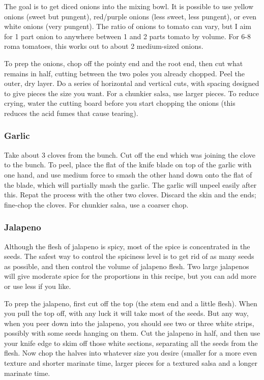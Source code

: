 The goal is to get diced onions into the mixing bowl. It is possible to use yellow onions (sweet but pungent), red/purple onions (less sweet, less pungent), or even white onions (very pungent). The ratio of onions to tomato can vary, but I aim for 1 part onion to anywhere between 1 and 2 parts tomato by volume. For 6-8 roma tomatoes, this works out to about 2 medium-sized onions.

To prep the onions, chop off the pointy end and the root end, then cut what remains in half, cutting between the two poles you already chopped. Peel the outer, dry layer. Do a series of horizontal and vertical cuts, with spacing designed to give pieces the size you want. For a chunkier salsa, use larger pieces. To reduce crying, water the cutting board before you start chopping the onions (this reduces the acid fumes that cause tearing).

\subsubsection{Garlic}

Take about 3 cloves from the bunch. Cut off the end which was joining the clove to the bunch. To peel, place the flat of the knife blade on top of the garlic with one hand, and use medium force to smash the other hand down onto the flat of the blade, which will partially mash the garlic. The garlic will unpeel easily after this. Repat the process with the other two cloves. Discard the skin and the ends; fine-chop the cloves. For chunkier salsa, use a coarser chop.

\subsubsection{Jalapeno}

Although the flesh of jalapeno is spicy, most of the spice is concentrated in the seeds. The safest way to control the spiciness level is to get rid of as many seeds as possible, and then control the volume of jalapeno flesh. Two large jalapenos will give moderate spice for the proportions in this recipe, but you can add more or use less if you like.

To prep the jalapeno, first cut off the top (the stem end and a little flesh). When you pull the top off, with any luck it will take most of the seeds. But any way, when you peer down into the jalapeno, you should see two or three white strips, possibly with some seeds hanging on them. Cut the jalapeno in half, and then use your knife edge to skim off those white sections, separating all the seeds from the flesh. Now chop the halves into whatever size you desire (smaller for a more even texture and shorter marinate time, larger pieces for a textured salsa and a longer marinate time.

